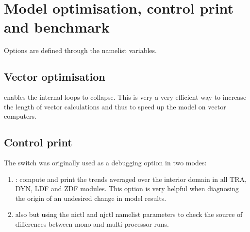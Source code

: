 \documentclass[../main/NEMO_manual]{subfiles}
\begin{document}
\section{Model optimisation, control print and benchmark}
\label{sec:MISC_opt}


Options are defined through the   namelist variables.

\subsection{Vector optimisation}

 enables the internal loops to collapse.
This is very a very efficient way to increase the length of vector calculations and thus
to speed up the model on vector computers.
 
 
 
\subsection{Control print}

The  switch was originally used as a debugging option in two modes:

\begin{enumerate}
\item{: compute and print the trends averaged over the interior domain in all TRA, DYN, LDF and
ZDF modules.
This option is very helpful when diagnosing the origin of an undesired change in model results. }

\item{also  but using the nictl and njctl namelist parameters to check the source of differences between
mono and multi processor runs.}
\end{enumerate}
\end{document}
